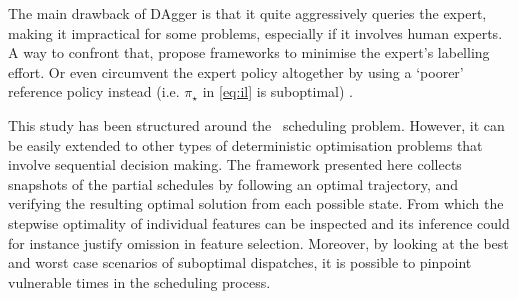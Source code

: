 \documentclass[twocolumn]{svjour3}
\begin{document}

The main drawback of DAgger is that it quite aggressively queries the expert, 
making it impractical for some problems, especially if it involves human 
experts. A way to confront that, \cite{Kim13,Judah12} propose frameworks to 
minimise the expert's labelling effort.
Or even circumvent the expert policy altogether by using a `poorer' reference 
policy instead (i.e. $\pi_\star$ in \cref{eq:il} is suboptimal) 
\cite{ChangKADL15}.

This study has been structured around the \jsp\ scheduling problem. However, 
it can be easily extended to other types of deterministic optimisation problems 
that involve sequential decision making. 
The framework presented here collects snapshots of the partial schedules by 
following an optimal trajectory, and verifying the resulting optimal solution 
from each possible state. 
From which the stepwise optimality of individual features can be inspected 
and its inference could for instance justify omission in feature selection. 
Moreover, by looking at the best and worst case scenarios of suboptimal 
dispatches, it is possible to pinpoint vulnerable times in the scheduling 
process. 

 
 
\end{document}
